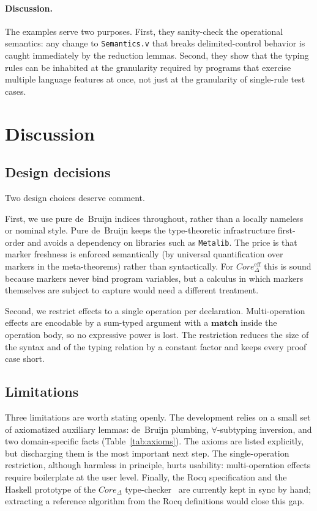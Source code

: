 \documentclass[12pt,a4paper]{article}
\newcommand{\keyword}[1]{\mathbf{#1}}
\begin{document}
    \paragraph{Discussion.}
    The examples serve two purposes.
    First, they sanity-check the operational semantics: any change to
    \texttt{Semantics.v} that breaks delimited-control behavior is caught immediately
    by the reduction lemmas.
    Second, they show that the typing rules can be inhabited at the granularity
    required by programs that exercise multiple language features at once,
    not just at the granularity of single-rule test cases.


    \section{Discussion} \label{sec:discussion}

    \subsection{Design decisions}

    Two design choices deserve comment.

    First, we use pure de~Bruijn indices throughout, rather than a locally nameless
    or nominal style.
    Pure de~Bruijn keeps the type-theoretic infrastructure first-order and avoids
    a dependency on libraries such as \texttt{Metalib}.
    The price is that marker freshness is enforced semantically (by universal
    quantification over markers in the meta-theorems) rather than syntactically.
    For $Core_\Delta^{\mathrm{eff}}$ this is sound because markers never bind program
    variables, but a calculus in which markers themselves are subject to capture
    would need a different treatment.

    Second, we restrict effects to a single operation per declaration.
    Multi-operation effects are encodable by a sum-typed argument with a
    $\keyword{match}$ inside the operation body, so no expressive power is lost.
    The restriction reduces the size of the syntax and of the typing relation by
    a constant factor and keeps every proof case short.

    \subsection{Limitations}

    Three limitations are worth stating openly.
    The development relies on a small set of axiomatized auxiliary lemmas:
    de~Bruijn plumbing, $\forall$-subtyping inversion, and two domain-specific
    facts (Table~\ref{tab:axioms}).
    The axioms are listed explicitly, but discharging them is the most important
    next step.
    The single-operation restriction, although harmless in principle, hurts
    usability: multi-operation effects require boilerplate at the user level.
    Finally, the Rocq specification and the Haskell prototype of the
    $Core_\Delta$ type-checker~\cite{stoyan2025existential} are currently kept in
    sync by hand; extracting a reference algorithm from the Rocq definitions
    would close this gap.
\end{document}
